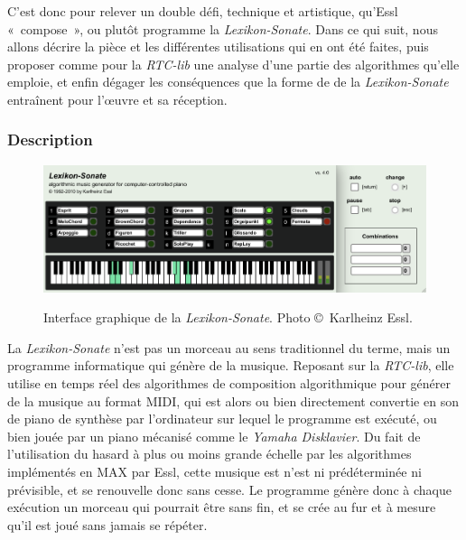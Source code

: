 \documentclass[a4paper,12pt]{article}
\newcommand{\guill}[1]{«~#1~»}
\begin{document}
C'est donc pour relever un double défi, technique et artistique, qu'Essl \guill{compose}, ou plutôt programme la \emph{Lexikon-Sonate}. Dans ce qui suit, nous allons décrire la pièce et les différentes utilisations qui en ont été faites, puis proposer comme pour la \emph{RTC-lib} une analyse d'une partie des algorithmes qu'elle emploie, et enfin dégager les conséquences que la forme de de la \emph{Lexikon-Sonate} entraînent pour l'œuvre et sa réception.

\subsubsection{Description}

\begin{figure}[h!]
\begin{center}
\includegraphics[width=\textwidth]{images/lexson.png}
\label{lsinterface}
\caption{\footnotesize Interface graphique de la \emph{Lexikon-Sonate}. Photo \copyright~Karlheinz Essl.}
\end{center}
\end{figure}

La \emph{Lexikon-Sonate} n'est pas un morceau au sens traditionnel du terme, mais un programme informatique qui génère de la musique. Reposant sur la \emph{RTC-lib}, elle utilise en temps réel des algorithmes de composition algorithmique pour générer de la musique au format MIDI, qui est alors ou bien directement convertie en son de piano de synthèse par l'ordinateur sur lequel le programme est exécuté, ou bien jouée par un piano mécanisé comme le \emph{Yamaha Disklavier}. Du fait de l'utilisation du hasard à plus ou moins grande échelle par les algorithmes implémentés en MAX par Essl, cette musique est n'est ni prédéterminée ni prévisible, et se renouvelle donc sans cesse. Le programme génère donc à chaque exécution un morceau qui pourrait être sans fin, et se crée au fur et à mesure qu'il est joué sans jamais se répéter.
\end{document}
